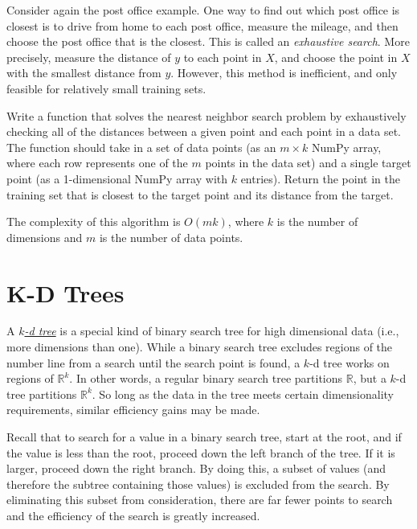 Consider again the post office example.
One way to find out which post office is closest is to drive from home to each post office, measure the mileage, and then choose the post office that is the closest.
This is called an \emph{exhaustive search}.
More precisely, measure the distance of $y$ to each point in $X$, and choose the point in $X$ with the smallest distance from $y$.
However, this method is inefficient, and only feasible for relatively small training sets.

\begin{problem} %
Write a function that solves the nearest neighbor search problem by exhaustively checking all of the distances between a given point and each point in a data set.
The function should take in a set of data points (as an $m \times k$ NumPy array, where each row represents one of the $m$ points in the data set) and a single target point (as a 1-dimensional NumPy array with $k$ entries).
Return the point in the training set that is closest to the target point and its distance from the target.

The complexity of this algorithm is $O(mk)$, where $k$ is the number of dimensions and $m$ is the number of data points.
\end{problem}

\section*{K-D Trees} %

A \href{https://en.wikipedia.org/wiki/K-d_tree}{\emph{$k$-d tree}} is a special kind of binary search tree for high dimensional data (i.e., more dimensions than one).
While a binary search tree excludes regions of the number line from a search until the search point is found, a $k$-d tree works on regions of $\mathbb{R}^k$. In other words, a regular binary search tree partitions $\mathbb{R}$, but a $k$-d tree partitions $\mathbb{R}^{k}$. 
So long as the data in the tree meets certain dimensionality requirements, similar efficiency gains may be made.

Recall that to search for a value in a binary search tree, start at the root, and if the value is less than the root, proceed down the left branch of the tree.
If it is larger, proceed down the right branch.
By doing this, a subset of values (and therefore the subtree containing those values) is excluded from the search.
By eliminating this subset from consideration, there are far fewer points to search and the efficiency of the search is greatly increased.

